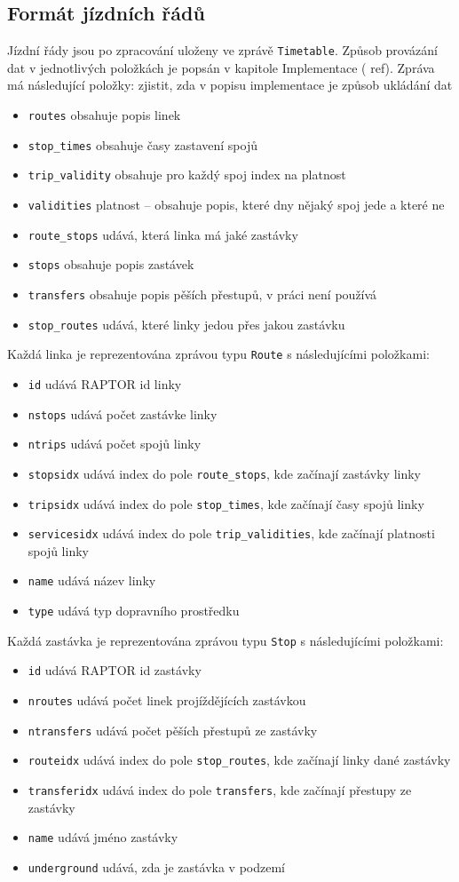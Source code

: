 \subsection{Formát jízdních řádů}
Jízdní řády jsou po zpracování uloženy ve zprávě {\tt Timetable}. Způsob
provázání dat v jednotlivých položkách je popsán v kapitole Implementace (\TODO
ref). Zpráva má následující položky:
\TODO zjistit, zda v popisu implementace je způsob ukládání dat
\begin{itemize}
	\item {\tt routes} obsahuje popis linek
	\item {\tt stop\_times} obsahuje časy zastavení spojů 
	\item {\tt trip\_validity} obsahuje pro každý spoj index na platnost 
	\item {\tt validities} platnost -- obsahuje popis, které dny nějaký spoj
	jede a které ne 
	\item {\tt route\_stops} udává, která linka má jaké zastávky 
	\item {\tt stops} obsahuje popis zastávek
	\item {\tt transfers} obsahuje popis pěších přestupů, v práci není
	používá 
	\item {\tt stop\_routes} udává, které linky jedou přes jakou zastávku
\end{itemize} 
Každá linka je reprezentována zprávou typu {\tt Route} s následujícími
položkami:
\begin{itemize}
	\item {\tt id} udává RAPTOR id linky 
	\item {\tt nstops} udává počet zastávke linky
	\item {\tt ntrips} udává počet spojů linky
	\item {\tt stopsidx} udává index do pole {\tt route\_stops}, kde
	začínají zastávky linky
	\item {\tt tripsidx} udává index do pole {\tt stop\_times}, kde
	začínají časy spojů linky
	\item {\tt servicesidx} udává index do pole {\tt trip\_validities}, kde
	začínají platnosti spojů linky
	\item {\tt name} udává název linky
	\item {\tt type} udává typ dopravního prostředku
\end{itemize}
Každá zastávka je reprezentována zprávou typu {\tt Stop} s následujícími
položkami:
\begin{itemize}
	\item {\tt id} udává RAPTOR id zastávky
	\item {\tt nroutes} udává počet linek projíždějících zastávkou
	\item {\tt ntransfers} udává počet pěších přestupů ze zastávky
	\item {\tt routeidx} udává index do pole {\tt stop\_routes}, kde
	začínají linky dané zastávky
	\item {\tt transferidx} udává index do pole {\tt transfers}, kde
	začínají přestupy ze zastávky
	\item {\tt name} udává jméno zastávky
	\item {\tt underground} udává, zda je zastávka v podzemí
\end{itemize}
